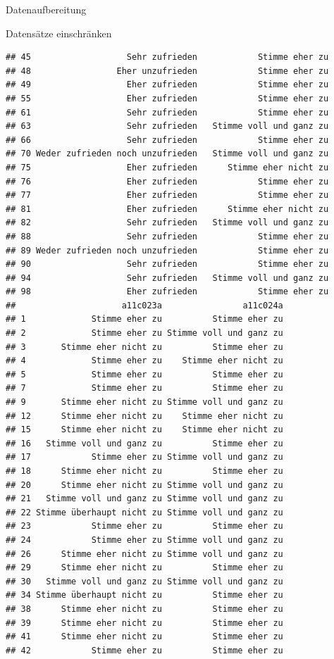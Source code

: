 \documentclass[ignorenonframetext,]{beamer}
\begin{document}
\begin{frame}[fragile]{Datenaufbereitung}
\begin{block}{Datensätze einschränken}
\begin{verbatim}
## 45                   Sehr zufrieden            Stimme eher zu
## 48                 Eher unzufrieden            Stimme eher zu
## 49                   Eher zufrieden            Stimme eher zu
## 55                   Eher zufrieden            Stimme eher zu
## 61                   Sehr zufrieden            Stimme eher zu
## 63                   Sehr zufrieden   Stimme voll und ganz zu
## 66                   Sehr zufrieden            Stimme eher zu
## 70 Weder zufrieden noch unzufrieden   Stimme voll und ganz zu
## 75                   Eher zufrieden      Stimme eher nicht zu
## 76                   Eher zufrieden            Stimme eher zu
## 77                   Eher zufrieden            Stimme eher zu
## 81                   Eher zufrieden      Stimme eher nicht zu
## 82                   Sehr zufrieden   Stimme voll und ganz zu
## 88                   Sehr zufrieden            Stimme eher zu
## 89 Weder zufrieden noch unzufrieden            Stimme eher zu
## 90                   Sehr zufrieden            Stimme eher zu
## 94                   Sehr zufrieden   Stimme voll und ganz zu
## 98                   Eher zufrieden            Stimme eher zu
##                     a11c023a                a11c024a
## 1             Stimme eher zu          Stimme eher zu
## 2             Stimme eher zu Stimme voll und ganz zu
## 3       Stimme eher nicht zu          Stimme eher zu
## 4             Stimme eher zu    Stimme eher nicht zu
## 5             Stimme eher zu          Stimme eher zu
## 7             Stimme eher zu          Stimme eher zu
## 9       Stimme eher nicht zu Stimme voll und ganz zu
## 12      Stimme eher nicht zu    Stimme eher nicht zu
## 15      Stimme eher nicht zu    Stimme eher nicht zu
## 16   Stimme voll und ganz zu          Stimme eher zu
## 17            Stimme eher zu Stimme voll und ganz zu
## 18      Stimme eher nicht zu          Stimme eher zu
## 20      Stimme eher nicht zu Stimme voll und ganz zu
## 21   Stimme voll und ganz zu Stimme voll und ganz zu
## 22 Stimme überhaupt nicht zu Stimme voll und ganz zu
## 23            Stimme eher zu          Stimme eher zu
## 24            Stimme eher zu Stimme voll und ganz zu
## 26      Stimme eher nicht zu Stimme voll und ganz zu
## 29      Stimme eher nicht zu          Stimme eher zu
## 30   Stimme voll und ganz zu Stimme voll und ganz zu
## 34 Stimme überhaupt nicht zu          Stimme eher zu
## 38      Stimme eher nicht zu          Stimme eher zu
## 39      Stimme eher nicht zu          Stimme eher zu
## 41      Stimme eher nicht zu          Stimme eher zu
## 42            Stimme eher zu          Stimme eher zu

\end{verbatim}
\end{block}
\end{frame}
\end{document}
